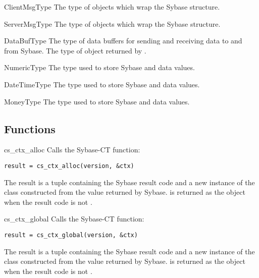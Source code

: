 \begin{datadesc}{ClientMsgType}
The type of  objects which wrap the Sybase
 structure.
\end{datadesc}

\begin{datadesc}{ServerMsgType}
The type of  objects which wrap the Sybase
 structure.
\end{datadesc}

\begin{datadesc}{DataBufType}
The type of data buffers for sending and receiving data to and from
Sybase.  The type of object returned by .
\end{datadesc}

\begin{datadesc}{NumericType}
The type used to store Sybase  and 
data values.
\end{datadesc}

\begin{datadesc}{DateTimeType}
The type used to store Sybase  and
 data values.
\end{datadesc}

\begin{datadesc}{MoneyType}
The type used to store Sybase  and 
data values.
\end{datadesc}

\subsection{Functions}

\begin{funcdesc}{cs_ctx_alloc}{}
Calls the Sybase-CT  function:

\begin{verbatim}
result = cs_ctx_alloc(version, &ctx)
\end{verbatim}

The result is a tuple containing the Sybase result code and a new
instance of the  class constructed from the
 value returned by Sybase.   is returned as the
 object when the result code is not
.
\end{funcdesc}

\begin{funcdesc}{cs_ctx_global}{}
Calls the Sybase-CT  function:

\begin{verbatim}
result = cs_ctx_global(version, &ctx)
\end{verbatim}

The result is a tuple containing the Sybase result code and a new
instance of the  class constructed from the
 value returned by Sybase.   is returned as the
 object when the result code is not
.
\end{funcdesc}

